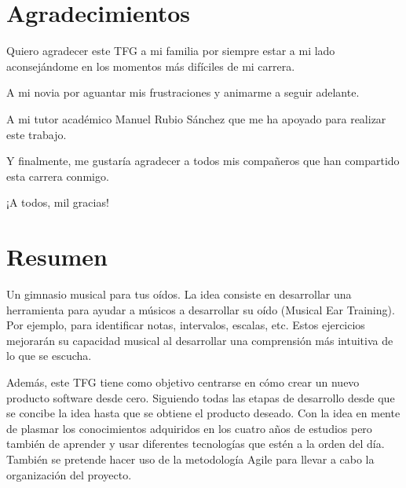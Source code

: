 \documentclass[12pt,twoside,titlepage]{report}
\newcommand\blankpage{%
    \newpage
    \null
    \thispagestyle{empty}%
    \newpage}
\begin{document}
\hypersetup{pageanchor=true}
\normalsize
\afterpage{\blankpage}
 
\setlength{\parskip}{0.75em}
\renewcommand{\baselinestretch}{1.25}

\setcounter{page}{2}


 

\chapter*{Agradecimientos}

Quiero agradecer este TFG a mi familia por siempre estar a mi lado aconsejándome en los momentos más difíciles de mi carrera. 

A mi novia por aguantar mis frustraciones y animarme a seguir adelante. 

A mi tutor académico Manuel Rubio Sánchez que me ha apoyado para realizar este trabajo. 

Y finalmente, me gustaría agradecer a todos mis compañeros que han compartido esta carrera conmigo.

¡A todos, mil gracias!
\afterpage{\blankpage}


 

\chapter*{Resumen}
Un gimnasio musical para tus oídos. La idea consiste en desarrollar una herramienta para ayudar a músicos a desarrollar su oído (Musical Ear Training). Por ejemplo, para identificar notas, intervalos, escalas, etc. Estos ejercicios mejorarán su capacidad musical al desarrollar una comprensión más intuitiva de lo que se escucha.

Además, este TFG tiene como objetivo centrarse en cómo crear un nuevo producto software desde cero. Siguiendo todas las etapas de desarrollo desde que se concibe la idea hasta que se obtiene el producto deseado. Con la idea en mente de plasmar los conocimientos adquiridos en los cuatro años de estudios pero también de aprender y usar diferentes tecnologías que estén a la orden del día. También se pretende hacer uso de la metodología Agile para llevar a cabo la organización del proyecto.
\end{document}
